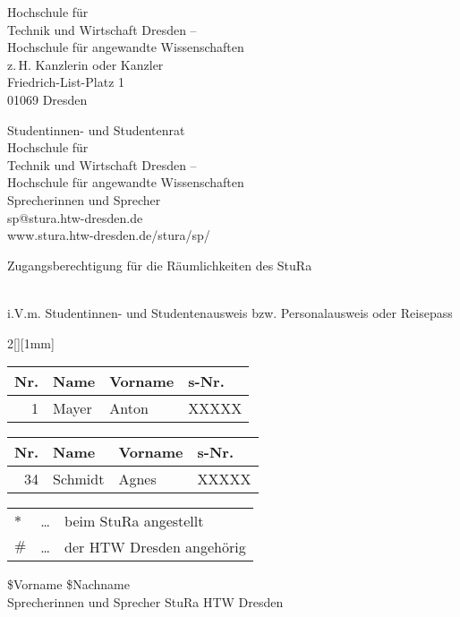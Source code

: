 \documentclass[ngerman]{scrartcl}
\newcommand{\Unterzeichner}{\$Vorname \$Nachname}
\begin{document}

\noindent
	\parbox[top][15em][t]{\dimexpr.5\linewidth-7mm}
	{%
		Hochschule für\\
		Technik und Wirtschaft Dresden –\\
		Hochschule für angewandte Wissenschaften\\

		z.\,H. Kanzlerin oder Kanzler\\
		Friedrich-List-Platz 1\\
		01069 Dresden
	}%
\hfill
	\parbox[top][15em][t]{\dimexpr.5\linewidth-12mm}
	{%
		Studentinnen- und Studentenrat \\

		Hochschule für\\
		Technik und Wirtschaft Dresden –\\
		Hochschule für angewandte Wissenschaften\\

		Sprecherinnen und Sprecher\\
		sp@stura.htw-dresden.de\\
		www.stura.htw-dresden.de/stura/sp/
	}%

\begin{center}
\begin{Large}Zugangsberechtigung für die Räumlichkeiten des StuRa \end{Large}\\
i.V.m. Studentinnen- und Studentenausweis bzw. Personalausweis oder Reisepass
\end{center}

\begin{multicols}{2}[][1mm]
\begin{tabularx}{\linewidth}{rXXX}
Nr. 	& Name 	 & Vorname 	& s-Nr.\\ \hline
1 & Mayer      & Anton   & XXXXX \\
\end{tabularx}

\begin{tabularx}{\linewidth}{rXXX}
Nr. 	& Name 	 & Vorname 		& s-Nr.\\ \hline
34 & Schmidt      & Agnes    & XXXXX \\
\end{tabularx}
%

\end{multicols}
%
\bigskip
\begin{tabular}{l*{2}{@{\,}l}}
$*$ & \dots & beim StuRa angestellt \\
$\#$ & \dots & der HTW Dresden angehörig \\
\end{tabular}
%
\bigskip
\begin{flushleft}
\end{flushleft}

\Unterzeichner \\
Sprecherinnen und Sprecher StuRa HTW Dresden
\end{document}
